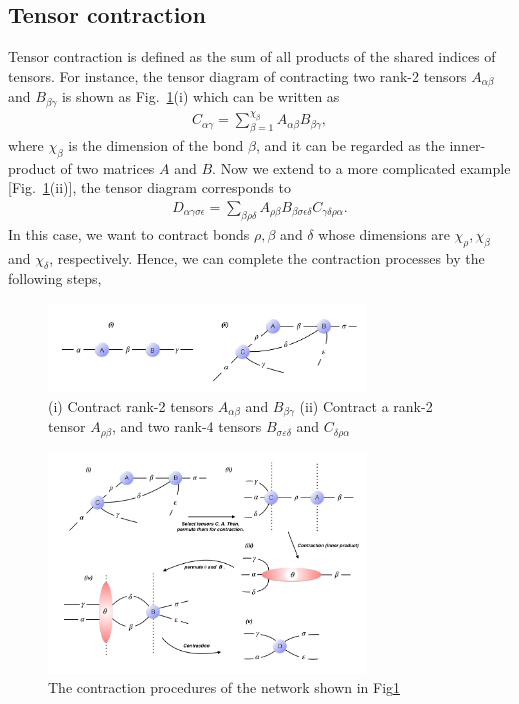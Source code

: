 \subsection{Tensor contraction}

Tensor contraction is defined as the sum of all products of the shared indices of tensors. For instance, the tensor diagram of contracting two rank-2 tensors $A_{\alpha \beta}$ and $B_{\beta \gamma}$ is shown as Fig.~\ref{fig222}(i) which can be written as
\begin{align}
	C_{\alpha \gamma}=\sum\limits_{\beta = 1}^{\chi_{\beta}}{A_{\alpha \beta}B_{\beta \gamma}},
\end{align}
where $\chi_{\beta}$ is the dimension of the bond $\beta$, and it can be regarded as the inner-product of two matrices $A$ and $B$. Now we extend to a more complicated example [Fig.~\ref{fig222}(ii)], the tensor diagram corresponds to 
\begin{align}
	D_{\alpha \gamma \sigma \epsilon}=\sum_{\beta \rho \delta}{A_{\rho \beta}B_{\beta \sigma \epsilon \delta}C_{\gamma \delta \rho \alpha}}.
\end{align}
In this case, we want to contract bonds $\rho,\beta$ and $\delta$ whose dimensions are $\chi_{\rho}, \chi_{\beta}$ and $\chi_{\delta}$, respectively. Hence, we can complete the contraction processes by the following steps,

\begin{figure}[H]
	\centering
	\includegraphics[width=0.75\textwidth]{figures/fig222.png}
	\caption[The examples of tensor diagrams.]{(i) Contract rank-2 tensors $A_{\alpha \beta}$ and $B_{\beta \gamma} $ (ii) Contract a rank-2 tensor $A_{\rho \beta}$, and two rank-4 tensors $B_{\sigma \varepsilon \delta}$ and $C_{\delta \rho \alpha}$}
	\label{fig222}
\end{figure}

\begin{figure}[ht]
	\centering
	\includegraphics[width=0.75\textwidth]{figures/fig223.png}
	\caption[The contraction procedures of the network shown in Fig\ref{fig222}(ii)]{ The contraction procedures of the network shown in Fig\ref{fig222}}
	\label{fig223}
\end{figure}

